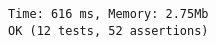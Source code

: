 \begin{lstlisting}[numbers=none, basicstyle=\ttfamily, caption={The result of PHPUnit}]
Time: 616 ms, Memory: 2.75Mb
OK (12 tests, 52 assertions)
\end{lstlisting}

